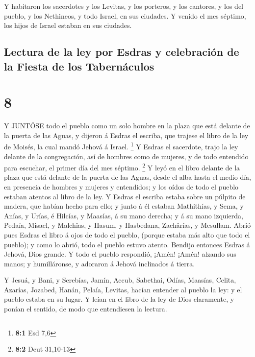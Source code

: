  Y habitaron los sacerdotes y los Levitas, y los porteros,
y los cantores, y los del pueblo, y los Nethineos, y todo Israel, en sus
ciudades. Y venido el mes séptimo, los hijos de Israel estaban en sus
ciudades.

\hypertarget{lectura-de-la-ley-por-esdras-y-celebraciuxf3n-de-la-fiesta-de-los-tabernuxe1culos}{%
\subsection{Lectura de la ley por Esdras y celebración de la Fiesta de
los
Tabernáculos}\label{lectura-de-la-ley-por-esdras-y-celebraciuxf3n-de-la-fiesta-de-los-tabernuxe1culos}}

\hypertarget{section-7}{%
\section{8}\label{section-7}}

 Y JUNTÓSE todo el pueblo como un solo hombre en la plaza
que está delante de la puerta de las Aguas, y dijeron á Esdras el
escriba, que trajese el libro de la ley de Moisés, la cual mandó Jehová
á Israel. \footnote{\textbf{8:1} Esd 7,6}  Y Esdras el
sacerdote, trajo la ley delante de la congregación, así de hombres como
de mujeres, y de todo entendido para escuchar, el primer día del mes
séptimo. \footnote{\textbf{8:2} Deut 31,10-13}  Y leyó en el
libro delante de la plaza que está delante de la puerta de las Aguas,
desde el alba hasta el medio día, en presencia de hombres y mujeres y
entendidos; y los oídos de todo el pueblo estaban atentos al libro de la
ley.  Y Esdras el escriba estaba sobre un púlpito de madera,
que habían hecho para ello; y junto á él estaban Mathithías, y Sema, y
Anías, y Urías, é Hilcías, y Maasías, á su mano derecha; y á su mano
izquierda, Pedaía, Misael, y Malchîas, y Hasum, y Hasbedana, Zachârías,
y Mesullam.  Abrió pues Esdras el libro á ojos de todo el
pueblo, (porque estaba más alto que todo el pueblo); y como lo abrió,
todo el pueblo estuvo atento.  Bendijo entonces Esdras á
Jehová, Dios grande. Y todo el pueblo respondió, ¡Amén! ¡Amén! alzando
sus manos; y humilláronse, y adoraron á Jehová inclinados á tierra.

 Y Jesuá, y Bani, y Serebías, Jamín, Accub, Sabethai, Odías,
Maasías, Celita, Azarías, Jozabed, Hanán, Pelaía, Levitas, hacían
entender al pueblo la ley: y el pueblo estaba en su lugar. 
Y leían en el libro de la ley de Dios claramente, y ponían el sentido,
de modo que entendiesen la lectura.

